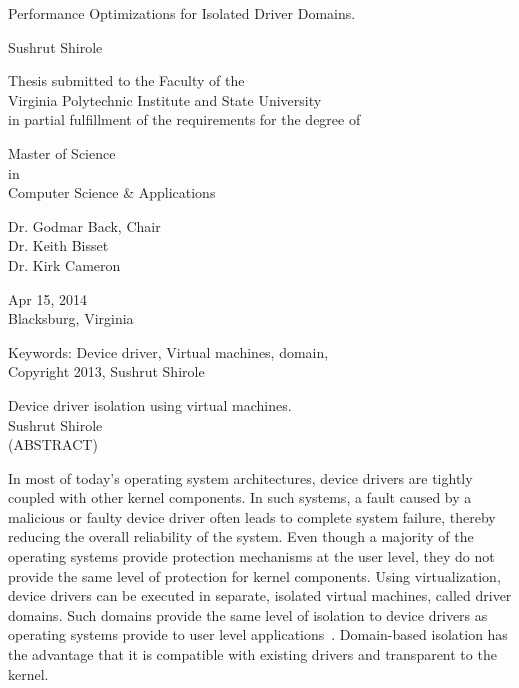 \documentclass[12pt]{report}
\begin{document}
\thispagestyle{empty}
\begin{center}

{\Large 
Performance Optimizations for Isolated Driver Domains.
}

\vfill

Sushrut Shirole

\vfill

Thesis submitted to the Faculty of the \\
Virginia Polytechnic Institute and State University \\
in partial fulfillment of the requirements for the degree of

\vfill

Master of Science \\
in \\
Computer Science \& Applications

\vfill

Dr. Godmar Back, Chair \\
Dr. Keith Bisset \\
Dr. Kirk Cameron\\


\vfill

Apr 15, 2014 \\
Blacksburg, Virginia

\vfill

Keywords: Device driver, Virtual machines, domain,  
\\
Copyright 2013, Sushrut Shirole

\end{center}

\pagebreak

\thispagestyle{empty}
\begin{center}

{\large 
Device driver isolation using virtual machines.
}
\\[8mm]
Sushrut Shirole
\\[8mm]
(ABSTRACT)
\\[10mm]
\end{center}
In most of today's operating system architectures, device drivers are
tightly coupled with other kernel components. In such systems, a fault
caused by a malicious or faulty device driver often leads to complete 
system failure, thereby reducing
the overall reliability of the system. Even though a majority of the operating
systems provide protection mechanisms at the user level, they do not
provide the same level of protection for kernel components.  
Using virtualization, device drivers can be executed in separate,
isolated virtual machines, called driver domains.  Such domains
provide the same level of isolation to device drivers as operating
systems provide to user level applications~\cite{Fraser04safehardware}.
Domain-based isolation has the advantage that it is compatible
with existing drivers and transparent to the kernel.
\end{document}
